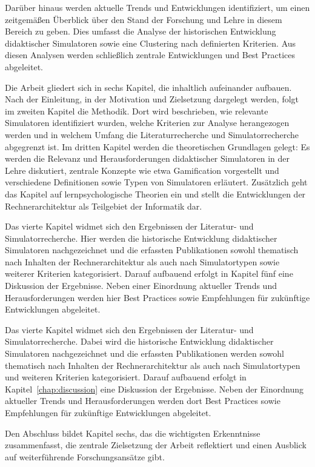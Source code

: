 Darüber hinaus werden aktuelle Trends und Entwicklungen identifiziert, um einen zeitgemäßen Überblick über den Stand der Forschung und Lehre in diesem Bereich zu geben. Dies umfasst die Analyse der historischen Entwicklung didaktischer Simulatoren sowie eine Clustering nach definierten Kriterien. Aus diesen Analysen werden schließlich zentrale Entwicklungen und Best Practices abgeleitet.

Die Arbeit gliedert sich in sechs Kapitel, die inhaltlich aufeinander aufbauen. Nach der Einleitung, in der Motivation und Zielsetzung dargelegt werden, folgt im zweiten Kapitel die Methodik. Dort wird beschrieben, wie relevante Simulatoren identifiziert wurden, welche Kriterien zur Analyse herangezogen werden und in welchem Umfang die Literaturrecherche und Simulatorrecherche abgegrenzt ist. Im dritten Kapitel werden die theoretischen Grundlagen gelegt: Es werden die Relevanz und Herausforderungen didaktischer Simulatoren in der Lehre diskutiert, zentrale Konzepte wie etwa Gamification vorgestellt und verschiedene Definitionen sowie Typen von Simulatoren erläutert. Zusätzlich geht das Kapitel auf lernpsychologische Theorien ein und stellt die Entwicklungen der Rechnerarchitektur als Teilgebiet der Informatik dar.

Das vierte Kapitel widmet sich den Ergebnissen der Literatur- und Simulatorrecherche. Hier werden die historische Entwicklung didaktischer Simulatoren nachgezeichnet und die erfassten Publikationen sowohl thematisch nach Inhalten der Rechnerarchitektur als auch nach Simulatortypen sowie weiterer Kriterien kategorisiert. Darauf aufbauend erfolgt in Kapitel fünf eine Diskussion der Ergebnisse. Neben einer Einordnung aktueller Trends und Herausforderungen werden hier Best Practices sowie Empfehlungen für zukünftige Entwicklungen abgeleitet. 

Das vierte Kapitel widmet sich den Ergebnissen der Literatur- und Simulatorrecherche. Dabei wird die historische Entwicklung didaktischer Simulatoren nachgezeichnet und die erfassten Publikationen werden sowohl thematisch nach Inhalten der Rechnerarchitektur als auch nach Simulatortypen und weiteren Kriterien kategorisiert. Darauf aufbauend erfolgt in Kapitel~\ref{chap:discussion} eine Diskussion der Ergebnisse. Neben der Einordnung aktueller Trends und Herausforderungen werden dort Best Practices sowie Empfehlungen für zukünftige Entwicklungen abgeleitet.

Den Abschluss bildet Kapitel sechs, das die wichtigsten Erkenntnisse zusammenfasst, die zentrale Zielsetzung der Arbeit reflektiert und einen Ausblick auf weiterführende Forschungsansätze gibt.

